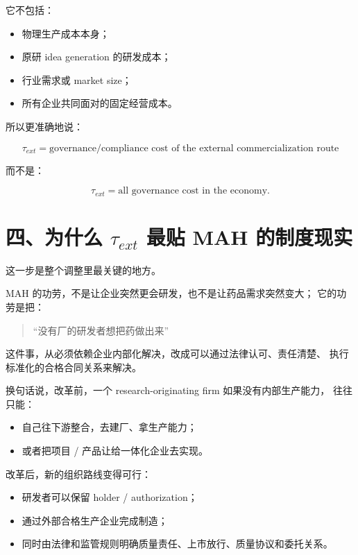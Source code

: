 \documentclass[12pt,fontset=none]{ctexart}
\begin{document}
它不包括：

\begin{itemize}[leftmargin=2em]
    \item 物理生产成本本身；
    \item 原研 idea generation 的研发成本；
    \item 行业需求或 market size；
    \item 所有企业共同面对的固定经营成本。
\end{itemize}

所以更准确地说：

\[
\tau_{ext}
=
\text{governance/compliance cost of the external commercialization route}
\]

而不是：

\[
\tau_{ext}
=
\text{all governance cost in the economy.}
\]

\section{四、为什么 \texorpdfstring{$\tau_{ext}$}{tau\_ext} 最贴 MAH 的制度现实}

这一步是整个调整里最关键的地方。

MAH 的功劳，不是让企业突然更会研发，也不是让药品需求突然变大；
它的功劳是把：

\begin{quote}
“没有厂的研发者想把药做出来”
\end{quote}

这件事，从必须依赖企业内部化解决，改成可以通过法律认可、责任清楚、
执行标准化的合格合同关系来解决。

换句话说，改革前，一个 research-originating firm 如果没有内部生产能力，
往往只能：

\begin{itemize}[leftmargin=2em]
    \item 自己往下游整合，去建厂、拿生产能力；
    \item 或者把项目 / 产品让给一体化企业去实现。
\end{itemize}

改革后，新的组织路线变得可行：

\begin{itemize}[leftmargin=2em]
    \item 研发者可以保留 holder / authorization；
    \item 通过外部合格生产企业完成制造；
    \item 同时由法律和监管规则明确质量责任、上市放行、质量协议和委托关系。
\end{itemize}
\end{document}
